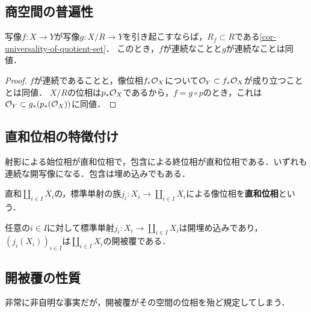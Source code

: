 \documentclass[uplatex,dvipdfmx]{jsreport}
\begin{document}
\subsection{商空間の普遍性}

\begin{proposition}
    写像$f:X\to Y$が写像$g:X/R\to Y$を引き起こすならば，$R_f\subset R$である\ref{cor-universality-of-quotient-set}．
    このとき，$f$が連続なことと$g$が連続なことは同値．
\end{proposition}
\begin{proof}
    $f$が連続であることと，像位相$f_*\mathcal{O}_X$について$\mathcal{O}_Y\subset f_*\mathcal{O}_X$が成り立つこととは同値．
    $X/R$の位相は$p_*\mathcal{O}_X$であるから，$f=g\circ p$のとき，これは$\mathcal{O}_Y\subset g_*(p_*(\mathcal{O}_X))$に同値．
\end{proof}

\subsection{直和位相の特徴付け}

\begin{tcolorbox}[colframe=ForestGreen, colback=ForestGreen!10!white,breakable,colbacktitle=ForestGreen!40!white,coltitle=black,fonttitle=\bfseries\sffamily,
title=]
    射影による始位相が直和位相で，包含による終位相が直和位相である．いずれも連続な開写像になる．包含は埋め込みでもある．
\end{tcolorbox}

\begin{definition}
    直和$\coprod_{i\in I}X_i$の，標準単射の族$j_i:X_i\to\coprod_{i\in I}X_i$による像位相を\textbf{直和位相}という．
\end{definition}

\begin{lemma}
    任意の$i\in I$に対して標準単射$j_i:X_i\to\coprod_{i\in I}X_i$は開埋め込みであり，$(j_i(X_i))_{i\in I}$は$\coprod_{i\in I}X_i$の開被覆である．
\end{lemma}

\subsection{開被覆の性質}

\begin{tcolorbox}[colframe=ForestGreen, colback=ForestGreen!10!white,breakable,colbacktitle=ForestGreen!40!white,coltitle=black,fonttitle=\bfseries\sffamily,
title=]
    非常に非自明な事実だが，開被覆がその空間の位相を殆ど規定してしまう．
\end{tcolorbox}
\end{document}
